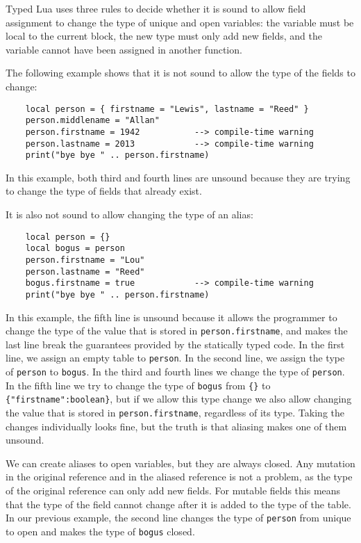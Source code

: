 Typed Lua uses three rules to decide whether it is sound to
allow field assignment to change the type of unique and open
variables:
the variable must be local to the current block,
the new type must only add new fields, and
the variable cannot have been assigned in another function.

The following example shows that it is not sound to allow the
type of the fields to change:
\begin{verbatim}
    local person = { firstname = "Lewis", lastname = "Reed" }
    person.middlename = "Allan"
    person.firstname = 1942           --> compile-time warning
    person.lastname = 2013            --> compile-time warning
    print("bye bye " .. person.firstname)
\end{verbatim}

In this example, both third and fourth lines are unsound because
they are trying to change the type of fields that already exist.

It is also not sound to allow changing the type of an alias:
\begin{verbatim}
    local person = {}
    local bogus = person
    person.firstname = "Lou"
    person.lastname = "Reed"
    bogus.firstname = true            --> compile-time warning
    print("bye bye " .. person.firstname)
\end{verbatim}

In this example, the fifth line is unsound because it allows the
programmer to change the type of the value that is stored in
\texttt{person.firstname}, and makes the last line break the
guarantees provided by the statically typed code.
In the first line, we assign an empty table to \texttt{person}.
In the second line, we assign the type of \texttt{person} to
\texttt{bogus}.
In the third and fourth lines we change the type of \texttt{person}.
In the fifth line we try to change the type of \texttt{bogus}
from \texttt{\{\}} to \texttt{\{"firstname":boolean\}},
but if we allow this type change we also allow changing the value
that is stored in \texttt{person.firstname}, regardless of its type.
Taking the changes individually looks fine, but the truth is that
aliasing makes one of them unsound.

We can create aliases to open variables, but they are always closed.
Any mutation in the original reference and in the aliased reference
is not a problem, as the type of the original reference can only
add new fields.
For mutable fields this means that the type of the field cannot
change after it is added to the type of the table.
In our previous example, the second line changes the type of
\texttt{person} from unique to open and makes the type of
\texttt{bogus} closed.

